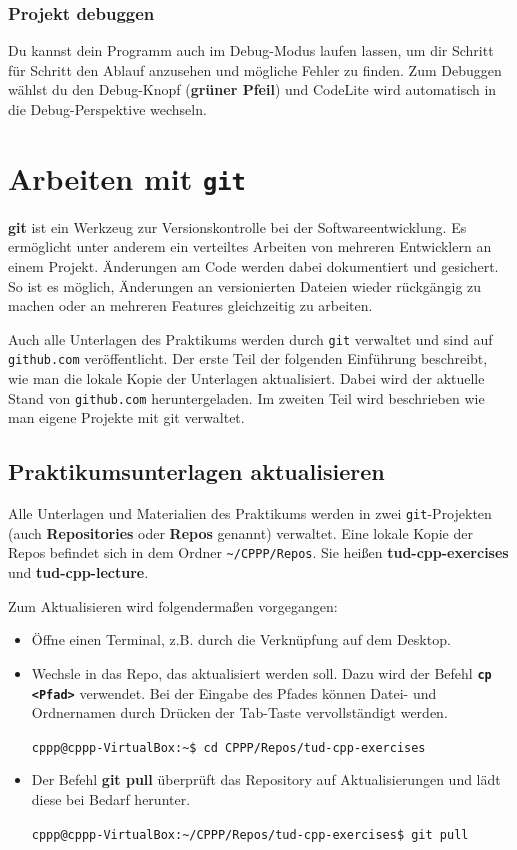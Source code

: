 \subsubsection{Projekt debuggen}
Du kannst dein Programm auch im Debug-Modus laufen lassen, um dir Schritt für Schritt den Ablauf anzusehen und mögliche Fehler zu finden.
Zum Debuggen wählst du den Debug-Knopf (\textbf{grüner Pfeil}) und CodeLite wird automatisch in die Debug-Perspektive wechseln. 

\section{\ExercisePrefixAdditionalInformation Arbeiten mit \texttt{git}}

\textbf{git} ist ein Werkzeug zur Versionskontrolle bei der Softwareentwicklung.
Es ermöglicht unter anderem ein verteiltes Arbeiten von mehreren Entwicklern an einem Projekt.
Änderungen am Code werden dabei dokumentiert und gesichert.
So ist es möglich, Änderungen an versionierten Dateien wieder rückgängig zu machen oder an mehreren Features gleichzeitig zu arbeiten.

Auch alle Unterlagen des Praktikums werden durch \texttt{git} verwaltet und sind auf \texttt{github.com} veröffentlicht.
Der erste Teil der folgenden Einführung beschreibt, wie man die lokale Kopie der Unterlagen aktualisiert.
Dabei wird der aktuelle Stand von \texttt{github.com} heruntergeladen.
Im zweiten Teil wird beschrieben wie man eigene Projekte mit git verwaltet.

\subsection{Praktikumsunterlagen aktualisieren}
Alle Unterlagen und Materialien des Praktikums werden in zwei \texttt{git}-Projekten (auch \textbf{Repositories} oder \textbf{Repos} genannt) verwaltet.
Eine lokale Kopie der Repos befindet sich in dem Ordner \texttt{\textasciitilde/CPPP/Repos}.
Sie heißen \textbf{tud-cpp-exercises} und \textbf{tud-cpp-lecture}.

Zum Aktualisieren wird folgendermaßen vorgegangen:

\begin{itemize}
\item Öffne einen Terminal, z.B. durch die Verknüpfung auf dem Desktop.
\item Wechsle in das Repo, das aktualisiert werden soll.
Dazu wird der Befehl \textbf{\texttt{cp <Pfad>}} verwendet.
Bei der Eingabe des Pfades können Datei- und Ordnernamen durch Drücken der Tab-Taste vervollständigt werden.

\texttt{cppp@cppp-VirtualBox:\textasciitilde\$ cd CPPP/Repos/tud-cpp-exercises}

\item Der Befehl \textbf{git pull} überprüft das Repository auf Aktualisierungen und lädt diese bei Bedarf herunter.

\texttt{cppp@cppp-VirtualBox:\textasciitilde/CPPP/Repos/tud-cpp-exercises\$ git pull}
\end{itemize}

